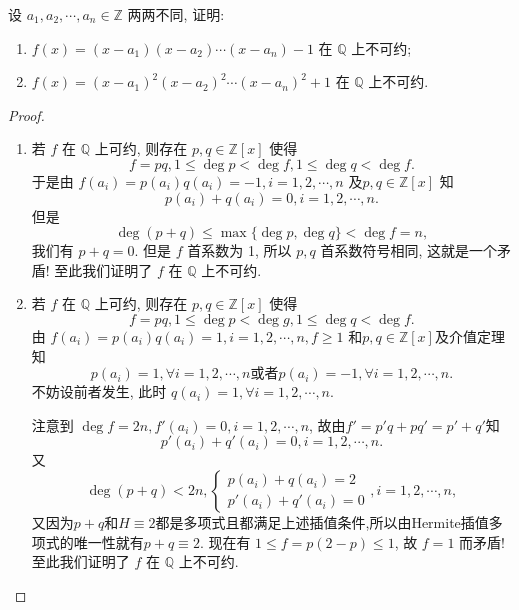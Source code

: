 \documentclass[../../main.tex]{subfiles}
\begin{document}
\begin{example}
设 \( a_1,a_2,\cdots,a_n \in \mathbb{Z} \) 两两不同, 证明:
\begin{enumerate}
\item \( f(x) = (x - a_1)(x - a_2)\cdots(x - a_n) - 1 \) 在 \( \mathbb{Q} \) 上不可约;

\item \( f(x) = (x - a_1)^2(x - a_2)^2\cdots(x - a_n)^2 + 1 \) 在 \( \mathbb{Q} \) 上不可约.
\end{enumerate}
\end{example}
\begin{proof}
\begin{enumerate}
\item 若 \( f \) 在 \( \mathbb{Q} \) 上可约, 则存在 \( p,q \in \mathbb{Z}[x] \) 使得
\[
f = pq, 1 \leq \deg p < \deg f, 1 \leq \deg q < \deg f.
\]
于是由 \( f(a_i) = p(a_i)q(a_i) = -1, i = 1,2,\cdots,n \) 及\( p,q \in \mathbb{Z}[x] \) 知
\[
p(a_i) + q(a_i) = 0, i = 1,2,\cdots,n.
\]
但是
\[
\deg(p + q) \leq \max\{\deg p, \deg q\} < \deg f = n,
\]
我们有 \( p + q = 0 \). 但是 \( f \) 首系数为 1, 所以 \( p,q \) 首系数符号相同, 这就是一个矛盾! 至此我们证明了 \( f \) 在 \( \mathbb{Q} \) 上不可约.

\item 若 \( f \) 在 \( \mathbb{Q} \) 上可约, 则存在 \( p,q \in \mathbb{Z}[x] \) 使得
\[
f = pq, 1 \leq \deg p < \deg g, 1 \leq \deg q < \deg f.
\]
由 \( f(a_i) = p(a_i)q(a_i) = 1, i = 1,2,\cdots,n, f \geq 1 \) 和\( p,q \in \mathbb{Z}[x] \)及介值定理知
\[
p(a_i) = 1, \forall i = 1,2,\cdots,n \text{或者} p(a_i) = -1, \forall i = 1,2,\cdots,n.
\]
不妨设前者发生, 此时 \( q(a_i) = 1, \forall i = 1,2,\cdots,n \).

注意到 \( \deg f = 2n, f'(a_i) = 0, i = 1,2,\cdots,n \), 故由$f'=p'q+pq'=p'+q'$知
\[p'(a_i) + q'(a_i) = 0, i = 1,2,\cdots,n .\] 又
\[
\deg(p + q) < 2n, \begin{cases} p(a_i) + q(a_i) = 2 \\ p'(a_i) + q'(a_i) = 0 \end{cases}, i = 1,2,\cdots,n,
\]
又因为$p+q$和$H\equiv 2$都是多项式且都满足上述插值条件,所以由Hermite插值多项式的唯一性就有\( p + q \equiv 2 \). 现在有 \( 1 \leq f = p(2 - p) \leq 1 \), 故 \( f = 1 \) 而矛盾! 至此我们证明了 \( f \) 在 \( \mathbb{Q} \) 上不可约.
\end{enumerate}
\end{proof}
\end{document}
